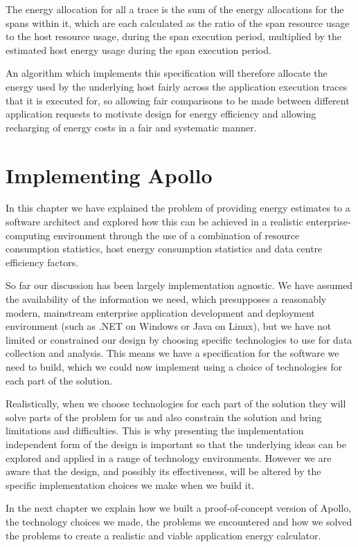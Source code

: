 The energy allocation for all a trace is the sum of the energy allocations for the spans within it, which are each calculated as the ratio of the span resource usage to the host resource usage, during the span execution period, multiplied by the estimated host energy usage during the span execution period.

An algorithm which implements this specification will therefore allocate the energy used by the underlying host fairly across the application execution traces that it is executed for, so allowing fair comparisons to be made between different application requests to motivate design for energy efficiency and allowing recharging of energy costs in a fair and systematic manner.

\section{Implementing Apollo}

In this chapter we have explained the problem of providing energy estimates to a software architect and explored how this can be achieved in a realistic enterprise-computing environment through the use of a combination of resource consumption statistics, host energy consumption statistics and data centre efficiency factors.

So far our discussion has been largely implementation agnostic.  We have assumed the availability of the information we need, which presupposes a reasonably modern, mainstream enterprise application development and deployment environment (such as .NET on Windows or Java on Linux), but we have not limited or constrained our design by choosing specific technologies to use for data collection and analysis.  This means we have a specification for the software we need to build, which we could now implement using a choice of technologies for each part of the solution.

Realistically, when we choose technologies for each part of the solution they will solve parts of the problem for us and also constrain the solution and bring limitations and difficulties.  This is why presenting the implementation independent form of the design is important so that the underlying ideas can be explored and applied in a range of technology environments.  However we are aware that the design, and possibly its effectiveness, will be altered by the specific implementation choices we make when we build it.

In the next chapter we explain how we built a proof-of-concept version of Apollo, the technology choices we made, the problems we encountered and how we solved the problems to create a realistic and viable application energy calculator.

















